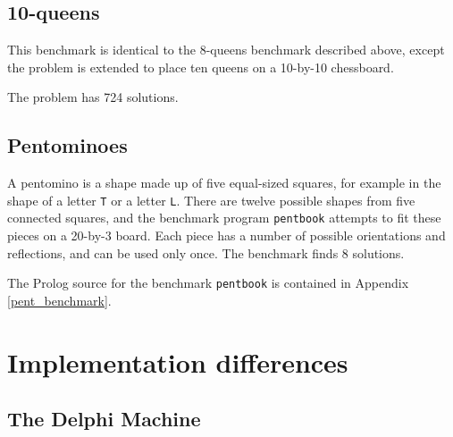 

\subsection{10-queens}

This benchmark is identical to the 8-queens benchmark described above, except
the problem is extended to place ten queens on a 10-by-10 chessboard.

The problem has 724 solutions.



\subsection{Pentominoes}

A pentomino is a shape made up of five equal-sized squares, for example in the
shape of a letter \texttt{T} or a letter \texttt{L}.
There are twelve possible shapes from five connected squares, and the
 benchmark program
\texttt{pentbook} attempts to fit these pieces on a 20-by-3 board.
Each piece has a number of possible orientations and reflections, and 
can be used only once. The
benchmark finds 8 solutions.

The Prolog source for the benchmark \texttt{pentbook} is contained in 
Appendix \ref{pent_benchmark}.


\section{Implementation differences}

\subsection{The Delphi Machine}

